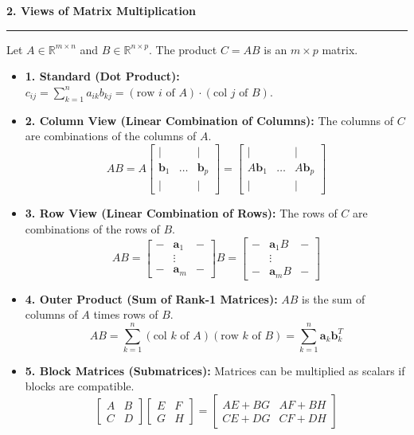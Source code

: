 \documentclass[10pt, landscape, twocolumn]{article}
\newcommand{\cheatsheetsection}[1]{
    \vspace{0.6em}
    {\color{themeblue}\large\bfseries #1} \par
    \vspace{-0.5em}
    {\color{themeblue}\rule{\linewidth}{1pt}} \par
    \vspace{0.2em}
}
\begin{document}
\cheatsheetsection{2. Views of Matrix Multiplication}
Let $A \in \mathbb{R}^{m \times n}$ and $B \in \mathbb{R}^{n \times p}$. The product $C = AB$ is an $m \times p$ matrix.
\begin{itemize}[leftmargin=*, itemsep=2pt, parsep=0pt]
    \item \textbf{1. Standard (Dot Product):} $c_{ij} = \displaystyle\sum\limits_{k=1}^n a_{ik}b_{kj} = (\text{row } i \text{ of } A) \cdot (\text{col } j \text{ of } B)$.
    \item \textbf{2. Column View (Linear Combination of Columns):} The columns of $C$ are combinations of the columns of $A$. 
    \[ AB = A \begin{bmatrix} | & & | \\ \mathbf{b}_1 & \dots & \mathbf{b}_p \\ | & & | \end{bmatrix} = \begin{bmatrix} | & & | \\ A\mathbf{b}_1 & \dots & A\mathbf{b}_p \\ | & & | \end{bmatrix} \]
    \item \textbf{3. Row View (Linear Combination of Rows):} The rows of $C$ are combinations of the rows of $B$.
    \[ AB = \begin{bmatrix} - & \mathbf{a}_1 & - \\ & \vdots & \\ - & \mathbf{a}_m & - \end{bmatrix} B = \begin{bmatrix} - & \mathbf{a}_1 B & - \\ & \vdots & \\ - & \mathbf{a}_m B & - \end{bmatrix} \]
    \item \textbf{4. Outer Product (Sum of Rank-1 Matrices):} $AB$ is the sum of columns of $A$ times rows of $B$.
    \[ AB = \sum_{k=1}^n (\text{col } k \text{ of } A)(\text{row } k \text{ of } B) = \sum_{k=1}^n \mathbf{a}_k \mathbf{b}_k^T \]
    \item \textbf{5. Block Matrices (Submatrices):} Matrices can be multiplied as scalars if blocks are compatible.
    \[ \begin{bmatrix} A & B \\ C & D \end{bmatrix} \begin{bmatrix} E & F \\ G & H \end{bmatrix} = \begin{bmatrix} AE+BG & AF+BH \\ CE+DG & CF+DH \end{bmatrix} \]
\end{itemize}
\end{document}
